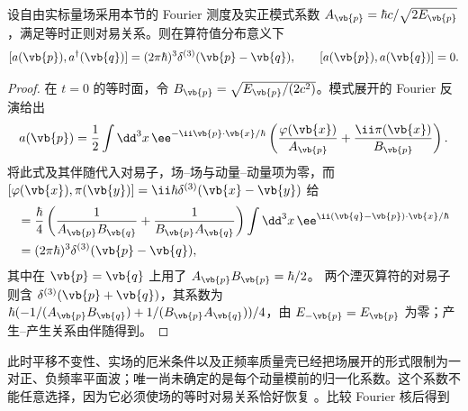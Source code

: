 \begin{proposition}
设自由实标量场采用本节的 Fourier 测度及实正模式系数 $A_{\vb{p}}=\hbar c/\sqrt{2E_{\vb{p}}}$，满足等时正则对易关系。则在算符值分布意义下
\[
[a(\vb{p}),a^\dagger(\vb{q})]=(2\pi\hbar)^3\delta^{(3)}(\vb{p}-\vb{q}),
\qquad [a(\vb{p}),a(\vb{q})]=0.
\]
\end{proposition}
\begin{proof}
在 $t=0$ 的等时面，令 $B_{\vb{p}}=\sqrt{E_{\vb{p}}/(2c^2)}$。模式展开的 Fourier 反演给出
\[
a(\vb{p})=\frac12\int\dd^3x\,\ee^{-\ii\vb{p}\cdot\vb{x}/\hbar}
\left(\frac{\varphi(\vb{x})}{A_{\vb{p}}}+\frac{\ii\pi(\vb{x})}{B_{\vb{p}}}\right).
\]
将此式及其伴随代入对易子，场--场与动量--动量项为零，而 $[\varphi(\vb{x}),\pi(\vb{y})]=\ii\hbar\delta^{(3)}(\vb{x}-\vb{y})$ 给
\begin{align*}
[a(\vb{p}),a^\dagger(\vb{q})]
&=\frac\hbar4\left(\frac1{A_{\vb{p}}B_{\vb{q}}}+
\frac1{B_{\vb{p}}A_{\vb{q}}}\right)
\int\dd^3x\,\ee^{\ii(\vb{q}-\vb{p})\cdot\vb{x}/\hbar}\\
&=(2\pi\hbar)^3\delta^{(3)}(\vb{p}-\vb{q}),
\end{align*}
其中在 $\vb{p}=\vb{q}$ 上用了 $A_{\vb{p}}B_{\vb{p}}=\hbar/2$。
两个湮灭算符的对易子则含 $\delta^{(3)}(\vb{p}+\vb{q})$，其系数为
$\hbar(-1/(A_{\vb{p}}B_{\vb{q}})+1/(B_{\vb{p}}A_{\vb{q}}))/4$，由 $E_{-\vb{p}}=E_{\vb{p}}$ 为零；产生--产生关系由伴随得到。
\end{proof}

此时平移不变性、实场的厄米条件以及正频率质量壳已经把场展开的形式限制为一对正、负频率平面波；唯一尚未确定的是每个动量模前的归一化系数。这个系数不能任意选择，因为它必须使场的等时对易关系恰好恢复 。比较 Fourier 核后得到


